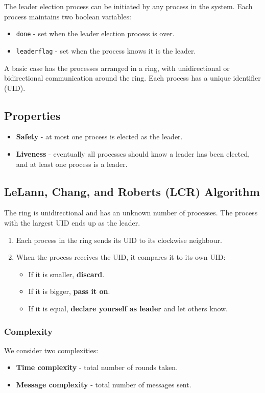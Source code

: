 \documentclass[11pt]{article}
\begin{document}
The leader election process can be initiated by any process in the system.
Each process maintains two boolean variables:
\begin{itemize}
  \item \texttt{done} - set when the leader election process is over.
  \item \texttt{leaderflag} - set when the process knows it is the leader.
\end{itemize}

A basic case has the processes arranged in a ring, with unidirectional or bidirectional communication around the ring.
Each process has a unique identifier (UID).

\subsection{Properties}
\begin{itemize}
  \item \textbf{Safety} - at most one process is elected as the leader.
  \item \textbf{Liveness} - eventually all processes should know a leader has been elected, and at least one process is a leader.
\end{itemize}

\subsection{LeLann, Chang, and Roberts (LCR) Algorithm}
The ring is unidirectional and has an unknown number of processes.
The process with the largest UID ends up as the leader.

\begin{enumerate}
  \item Each process in the ring sends its UID to its clockwise neighbour.
  \item When the process receives the UID, it compares it to its own UID:
    \begin{itemize}
      \item If it is smaller, \textbf{discard}.
      \item If it is bigger, \textbf{pass it on}.
      \item If it is equal, \textbf{declare yourself as leader} and let others know.
    \end{itemize}
\end{enumerate}

\subsubsection{Complexity}
We consider two complexities:
\begin{itemize}
  \item \textbf{Time complexity} - total number of rounds taken.
  \item \textbf{Message complexity} - total number of messages sent.
\end{itemize}
\end{document}
